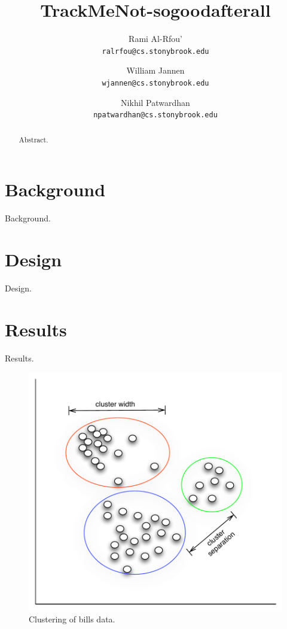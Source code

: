\documentclass[11pt, twocolumn]{article}
\title{TrackMeNot-sogoodafterall}
\author{Rami Al-Rfou' \\{\texttt{ralrfou@cs.stonybrook.edu}}
\and William Jannen \\{\texttt{wjannen@cs.stonybrook.edu}}
\and Nikhil Patwardhan \\{\texttt{npatwardhan@cs.stonybrook.edu}}
}
\begin{document}
\maketitle

\pagestyle{headings}

\begin{abstract}
  Abstract.
\end{abstract}

\section{Background}
\label{sec:background}
Background.

\section{Design}
\label{sec:design}
Design.

\section{Results}
\label{sec:results}

Results.

  \begin{figure}[h]
    \centering
    \includegraphics[width=\linewidth]{clusterbill1}
    \caption{Clustering of bills data.}
    \label{fig:cluster.bill}
  \end{figure}
\end{document}
